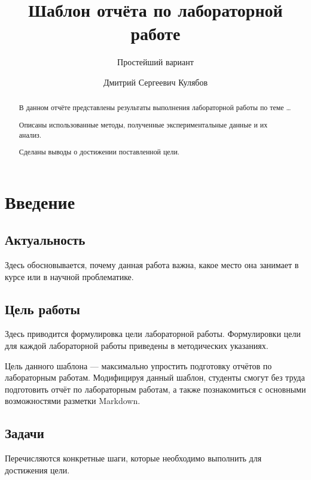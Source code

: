 \documentclass[
  english,
  russian,
  12pt,
  a4paper,
  DIV=11,
  numbers=noendperiod]{scrreprt}
\title{Шаблон отчёта по лабораторной работе}
\subtitle{Простейший вариант}
\author{Дмитрий Сергеевич Кулябов}
\date{}
\renewcommand*\contentsname{Содержание}
\newcommand\contentsname{Содержание}
\begin{document}
\maketitle
\begin{abstract}
В данном отчёте представлены результаты выполнения лабораторной работы
по теме \ldots{}

Описаны использованные методы, полученные экспериментальные данные и их
анализ.

Сделаны выводы о достижении поставленной цели.
\end{abstract}

\renewcommand*\contentsname{Содержание}
{
\setcounter{tocdepth}{1}
\tableofcontents
}
\listoffigures
\listoftables

\chapter{Введение}\label{ux432ux432ux435ux434ux435ux43dux438ux435}

\section{Актуальность}\label{ux430ux43aux442ux443ux430ux43bux44cux43dux43eux441ux442ux44c}

Здесь обосновывается, почему данная работа важна, какое место она
занимает в курсе или в научной проблематике.

\section{Цель
работы}\label{ux446ux435ux43bux44c-ux440ux430ux431ux43eux442ux44b}

Здесь приводится формулировка цели лабораторной работы. Формулировки
цели для каждой лабораторной работы приведены в методических указаниях.

Цель данного шаблона --- максимально упростить подготовку отчётов по
лабораторным работам. Модифицируя данный шаблон, студенты смогут без
труда подготовить отчёт по лабораторным работам, а также познакомиться с
основными возможностями разметки Markdown.

\section{Задачи}\label{ux437ux430ux434ux430ux447ux438}

Перечисляются конкретные шаги, которые необходимо выполнить для
достижения цели.
\end{document}
